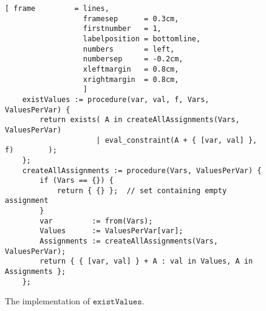 \begin{figure}[!ht]
\centering
\begin{Verbatim}[ frame         = lines, 
                  framesep      = 0.3cm, 
                  firstnumber   = 1,
                  labelposition = bottomline,
                  numbers       = left,
                  numbersep     = -0.2cm,
                  xleftmargin   = 0.8cm,
                  xrightmargin  = 0.8cm,
                  ]
    existValues := procedure(var, val, f, Vars, ValuesPerVar) {
        return exists( A in createAllAssignments(Vars, ValuesPerVar) 
                     | eval_constraint(A + { [var, val] }, f)        );
    };
    createAllAssignments := procedure(Vars, ValuesPerVar) {
        if (Vars == {}) {
            return { {} };  // set containing empty assignment
        }
        var         := from(Vars);
        Values      := ValuesPerVar[var];
        Assignments := createAllAssignments(Vars, ValuesPerVar);
        return { { [var, val] } + A : val in Values, A in Assignments };
    };
\end{Verbatim}
\vspace*{-0.3cm}
\caption{The implementation of $\texttt{existValues}$.}
\label{fig:csp-consistency.stlx:existValues}
\end{figure}

